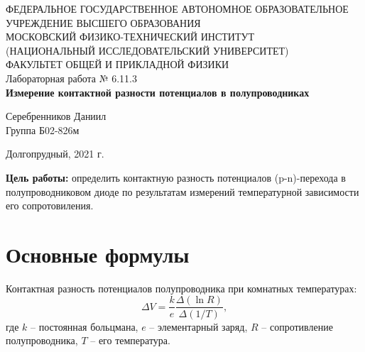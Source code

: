 \documentclass[a4paper,12pt]{article} %
\begin{document}
\begin{center}
	\footnotesize{ФЕДЕРАЛЬНОЕ ГОСУДАРСТВЕННОЕ АВТОНОМНОЕ ОБРАЗОВАТЕЛЬНОЕ 			УЧРЕЖДЕНИЕ ВЫСШЕГО ОБРАЗОВАНИЯ}\\
	\footnotesize{МОСКОВСКИЙ ФИЗИКО-ТЕХНИЧЕСКИЙ ИНСТИТУТ\\(НАЦИОНАЛЬНЫЙ 			ИССЛЕДОВАТЕЛЬСКИЙ УНИВЕРСИТЕТ)}\\
	\footnotesize{ФАКУЛЬТЕТ ОБЩЕЙ И ПРИКЛАДНОЙ ФИЗИКИ\\}
	\hfill \break
	\hfill\break
	\hfill\break
	\hfill \break
	\hfill \break
	\hfill \break
	\hfill \break
	\hfill \break
	\hfill \break
	\hfill \break
	\hfill \break
	\hfill \break
	\hfill \break
	\hfill \break
	\large{Лабораторная работа № 6.11.3 \\\textbf{Измерение контактной разности потенциалов в полупроводниках}}\\
	\hfill \break
	\hfill \break
	\hfill \break
	\begin{flushright}
		Серебренников Даниил\\
		Группа Б02-826м
	\end{flushright}
	\hfill \break
	\hfill \break
	\hfill \break
	\hfill \break
	\hfill \break
	\hfill \break
	\hfill \break
	\hfill \break
	\hfill \break
	\hfill \break
	\hfill \break
\end{center}
\begin{center}
	Долгопрудный, 2021 г.
\end{center}
\thispagestyle{empty}
\newpage
	\textbf{Цель работы:} определить контактную разность потенциалов (p-n)-перехода в полупроводниковом диоде по результатам измерений температурной зависимости его сопротовиления.

\section{Основные формулы}
	Контактная разность потенциалов полупроводника при комнатных температурах:
	\begin{equation*}
		\label{eq:formula}
		\tag{$\star$}
		\Delta V = \frac{k}{e} \frac{\Delta (\ln R)}{\Delta(1/T)},
	\end{equation*}
	где $k$ -- постоянная больцмана, $e$ -- элементарный заряд, $R$ -- сопротивление полупроводника, $T$ -- его температура.
\end{document}
